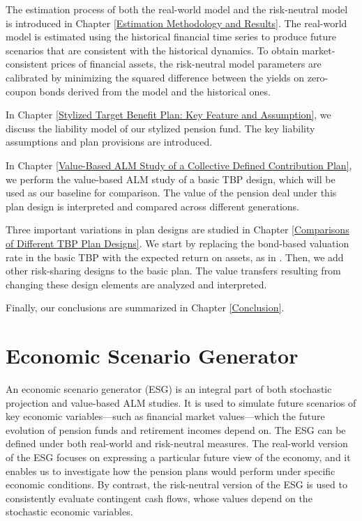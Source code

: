 \documentclass{sfuthesis}
\numberwithin{equation}{chapter}
\begin{document}
	
		\justify
		The estimation process of both the real-world model and the risk-neutral model is introduced in Chapter \ref{Estimation Methodology and Results}. The real-world model is estimated using the historical financial time series to produce future scenarios that are consistent with the historical dynamics. To obtain market-consistent prices of financial assets, the risk-neutral model parameters are calibrated by minimizing the squared difference between the yields on zero-coupon bonds derived from the model and the historical ones.
	

		\justify
		In Chapter \ref{Stylized Target Benefit Plan: Key Feature and Assumption}, we discuss the liability model of our stylized pension fund. The key liability assumptions and plan provisions are introduced. 
	
	
	
		\justify
		In Chapter \ref{Value-Based ALM Study of a Collective Defined Contribution Plan}, we perform the value-based ALM study of a basic TBP design, which will be used as our baseline for comparison. The value of the pension deal under this plan design is interpreted and compared across different generations.
	
	
	
		\justify
		Three important variations in plan designs are studied in Chapter \ref{Comparisons of Different TBP Plan Designs}. We start by replacing the bond-based valuation rate in the basic TBP with the expected return on assets, as in \citet{Ma2018}. Then, we add other risk-sharing designs to the basic plan. The value transfers resulting from changing these design elements are analyzed and interpreted.
	
	
	
		\justify
		Finally, our conclusions are summarized in Chapter \ref{Conclusion}.
	
	
	
	
	\chapter{Economic Scenario Generator} 
	\label{Economic Scenario Generator}

		\justify
		An economic scenario generator (ESG) is an integral part of both stochastic projection and value-based ALM studies. It is used to simulate future scenarios of key economic variables---such as financial market values---which the future evolution of pension funds and retirement incomes depend on. The ESG can be defined under both real-world and risk-neutral measures. The real-world version of the ESG focuses on expressing a particular future view of the economy, and it enables us to investigate how the pension plans would perform under specific economic conditions. By contrast, the risk-neutral version of the ESG is used to consistently evaluate contingent cash flows, whose values depend on the stochastic economic variables.
\end{document}
